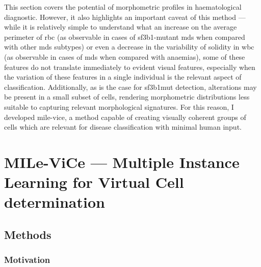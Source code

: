 \begin{figure}[!ht]
    \label{fig:multiclass-auc-heatmap}
\end{figure}

This section covers the potential of morphometric profiles in haematological diagnostic. However, it also highlights an important caveat of this method --- while it is relatively simple to understand what an increase on the average perimeter of \ac{rbc} (as observable in cases of \ac{sf3b1}-mutant \ac{mds} when compared with other \ac{mds} subtypes) or even a decrease in the variability of solidity in \ac{wbc} (as observable in cases of \ac{mds} when compared with anaemias), some of these features do not translate immediately to evident visual features, especially when the variation of these features in a single individual is the relevant aspect of classification. Additionally, as is the case for \ac{sf3b1}mut detection, alterations may be present in a small subset of cells, rendering morphometric distributions less suitable to capturing relevant morphological signatures. For this reason, I developed \ac{mile-vice}, a method capable of creating visually coherent groups of cells which are relevant for disease classification with minimal human input.

\section{MILe-ViCe --- Multiple Instance Learning for Virtual Cell determination}

\subsection{Methods}

\subsubsection{Motivation}

